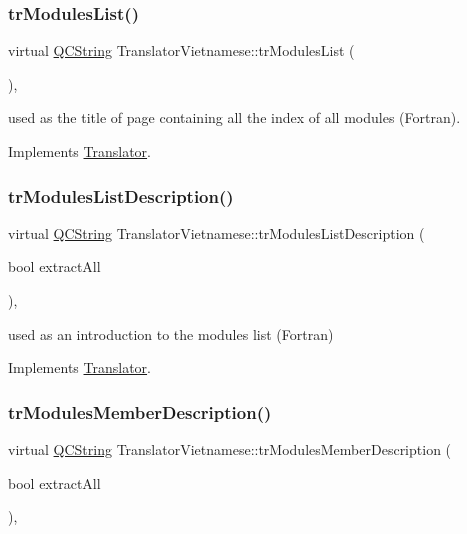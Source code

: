 \subsubsection{\texorpdfstring{trModulesList()}{trModulesList()}}
{\footnotesize\ttfamily virtual \mbox{\hyperlink{class_q_c_string}{Q\+C\+String}} Translator\+Vietnamese\+::tr\+Modules\+List (\begin{DoxyParamCaption}{ }\end{DoxyParamCaption})\hspace{0.3cm}{\ttfamily [inline]}, {\ttfamily [virtual]}}

used as the title of page containing all the index of all modules (Fortran). 

Implements \mbox{\hyperlink{class_translator}{Translator}}.

\mbox{\label{class_translator_vietnamese_a64188e5b65ea804930b57f9c9b3cfae8}} 
\subsubsection{\texorpdfstring{trModulesListDescription()}{trModulesListDescription()}}
{\footnotesize\ttfamily virtual \mbox{\hyperlink{class_q_c_string}{Q\+C\+String}} Translator\+Vietnamese\+::tr\+Modules\+List\+Description (\begin{DoxyParamCaption}\item[{bool}]{extract\+All }\end{DoxyParamCaption})\hspace{0.3cm}{\ttfamily [inline]}, {\ttfamily [virtual]}}

used as an introduction to the modules list (Fortran) 

Implements \mbox{\hyperlink{class_translator}{Translator}}.

\mbox{\label{class_translator_vietnamese_af26a2aef7bd9e2d9b4b2a14c0868f1c7}} 
\subsubsection{\texorpdfstring{trModulesMemberDescription()}{trModulesMemberDescription()}}
{\footnotesize\ttfamily virtual \mbox{\hyperlink{class_q_c_string}{Q\+C\+String}} Translator\+Vietnamese\+::tr\+Modules\+Member\+Description (\begin{DoxyParamCaption}\item[{bool}]{extract\+All }\end{DoxyParamCaption})\hspace{0.3cm}{\ttfamily [inline]}, {\ttfamily [virtual]}}

